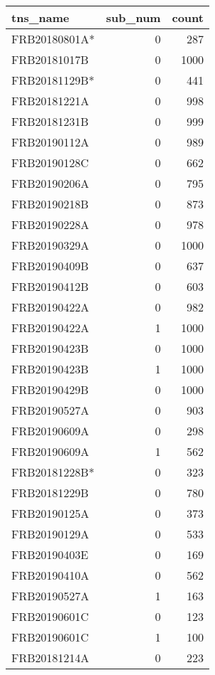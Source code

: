\begin{tabular}{lrr}
\toprule
tns_name & sub_num & count \\
\midrule
FRB20180801A* & 0 & 287 \\
FRB20181017B & 0 & 1000 \\
FRB20181129B* & 0 & 441 \\
FRB20181221A & 0 & 998 \\
FRB20181231B & 0 & 999 \\
FRB20190112A & 0 & 989 \\
FRB20190128C & 0 & 662 \\
FRB20190206A & 0 & 795 \\
FRB20190218B & 0 & 873 \\
FRB20190228A & 0 & 978 \\
FRB20190329A & 0 & 1000 \\
FRB20190409B & 0 & 637 \\
FRB20190412B & 0 & 603 \\
FRB20190422A & 0 & 982 \\
FRB20190422A & 1 & 1000 \\
FRB20190423B & 0 & 1000 \\
FRB20190423B & 1 & 1000 \\
FRB20190429B & 0 & 1000 \\
FRB20190527A & 0 & 903 \\
FRB20190609A & 0 & 298 \\
FRB20190609A & 1 & 562 \\
FRB20181228B* & 0 & 323 \\
FRB20181229B & 0 & 780 \\
FRB20190125A & 0 & 373 \\
FRB20190129A & 0 & 533 \\
FRB20190403E & 0 & 169 \\
FRB20190410A & 0 & 562 \\
FRB20190527A & 1 & 163 \\
FRB20190601C & 0 & 123 \\
FRB20190601C & 1 & 100 \\
FRB20181214A & 0 & 223 \\
\bottomrule
\end{tabular}
